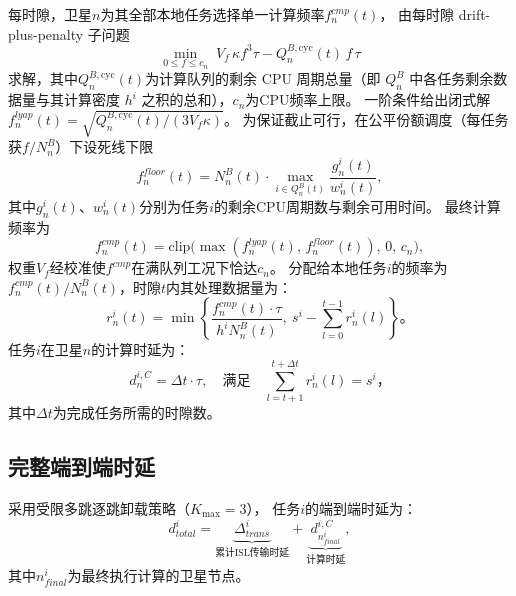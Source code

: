 \documentclass[a4paper,11pt]{article}
\begin{document}
每时隙，卫星$n$为其全部本地任务选择单一计算频率$f^{cmp}_n(t)$，
由每时隙 drift-plus-penalty 子问题
\begin{equation}
    \min_{0 \le f \le c_n}\; V_f\,\kappa f^3\tau - Q^{B,\mathrm{cyc}}_n(t)\,f\,\tau
\end{equation}
求解，其中$Q^{B,\mathrm{cyc}}_n(t)$为计算队列的剩余 CPU 周期总量（即 $Q^B_n$ 中各任务剩余数据量与其计算密度 $h^i$ 之积的总和），$c_n$为CPU频率上限。
一阶条件给出闭式解$f^{lyap}_n(t) = \sqrt{Q^{B,\mathrm{cyc}}_n(t)/(3 V_f \kappa)}$。
为保证截止可行，在公平份额调度（每任务获$f/N^B_n$）下设死线下限
\begin{equation}
    f^{floor}_n(t) = N^B_n(t)\cdot\max_{i \in Q^B_n(t)}
    \frac{g^i_n(t)}{w^i_n(t)},
\end{equation}
其中$g^i_n(t)$、$w^i_n(t)$分别为任务$i$的剩余CPU周期数与剩余可用时间。
最终计算频率为
\begin{equation}
    f^{cmp}_n(t) = \mathrm{clip}\!\big(\max(f^{lyap}_n(t),\, f^{floor}_n(t)),\, 0,\, c_n\big),
    \label{eq:cpu_alloc}
\end{equation}
权重$V_f$经校准使$f^{cmp}$在满队列工况下恰达$c_n$。
分配给本地任务$i$的频率为$f^{cmp}_n(t)/N^B_n(t)$，时隙$t$内其处理数据量为：
\begin{equation}
    r^i_n(t) = \min\!\left\{
    \frac{f^{cmp}_n(t) \cdot \tau}{h^i N^B_n(t)},~
    s^i - \sum_{l=0}^{t-1} r^i_n(l)\right\}。
    \label{eq:workload}
\end{equation}
任务$i$在卫星$n$的计算时延为：
\begin{equation}
    d^{i,C}_n = \Delta t \cdot \tau,\quad
    \text{满足}\quad
    \sum_{l=t+1}^{t+\Delta t} r^i_n(l) = s^i，
    \label{eq:comp_delay}
\end{equation}
其中$\Delta t$为完成任务所需的时隙数。

\subsection{完整端到端时延}

采用受限多跳逐跳卸载策略（$K_{\max}=3$），
任务$i$的端到端时延为：
\begin{equation}
    d^i_{total} =
    \underbrace{\Delta^i_{trans}}_{\text{累计ISL传输时延}}
    + \underbrace{d^{i,C}_{n^i_{final}}}_{\text{计算时延}},
    \label{eq:e2e_delay}
\end{equation}
其中$n^i_{final}$为最终执行计算的卫星节点。
\end{document}
